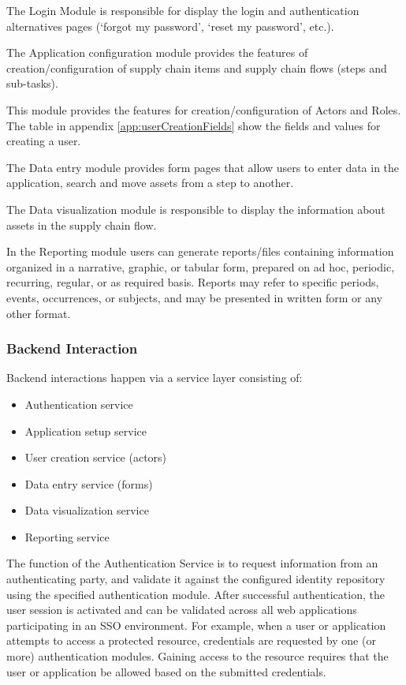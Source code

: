 The Login Module is responsible for display the login and authentication alternatives pages (‘forgot my password’, ‘reset my password’, etc.).

The Application configuration module provides the features of creation/configuration of supply chain items and supply chain flows (steps and sub-tasks).

This module provides the features for creation/configuration of Actors and Roles. The table in appendix \ref{app:userCreationFields} show the fields and values for creating a user.

The Data entry module provides form pages that allow users to enter data in the application, search and move assets from a step to another.

The Data visualization module is responsible to display the information about assets in the supply chain flow. 

In the Reporting module users can generate reports/files containing information organized in a narrative, graphic, or tabular form, prepared on ad hoc, periodic, recurring, regular, or as required basis. Reports may refer to specific periods, events, occurrences, or subjects, and may be presented in written form or any other format.

\subsubsection{Backend Interaction}\label{sec:BackendInteraction}
Backend interactions happen via a service layer consisting of:

\begin{itemize}
\item Authentication service
\item Application setup service
\item User creation service (actors)
\item Data entry service (forms)
\item Data visualization service
\item Reporting service
\end{itemize}

The function of the Authentication Service is to request information from an authenticating party, and validate it against the configured identity repository using the specified authentication module. After successful authentication, the user session is activated and can be validated across all web applications participating in an SSO environment. For example, when a user or application attempts to access a protected resource, credentials are requested by one (or more) authentication modules. Gaining access to the resource requires that the user or application be allowed based on the submitted credentials.

